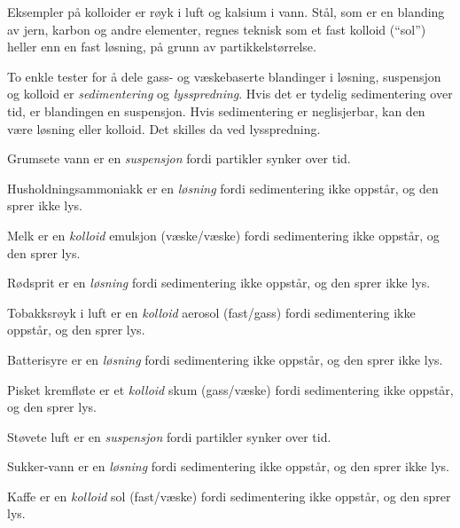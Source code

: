 \vskip 10pt

Eksempler på kolloider er røyk i luft og kalsium i vann. Stål, som er en blanding av jern, karbon og andre elementer, regnes teknisk som et fast kolloid (``sol'') heller enn en fast løsning, på grunn av partikkelstørrelse.

\vskip 10pt

To enkle tester for å dele gass- og væskebaserte blandinger i løsning, suspensjon og kolloid er {\it sedimentering} og {\it lysspredning}. Hvis det er tydelig sedimentering over tid, er blandingen en suspensjon. Hvis sedimentering er neglisjerbar, kan den være løsning eller kolloid. Det skilles da ved lysspredning.

\vskip 10pt

Grumsete vann er en {\it suspensjon} fordi partikler synker over tid.

\vskip 10pt

Husholdningsammoniakk er en {\it løsning} fordi sedimentering ikke oppstår, og den sprer ikke lys.

\vskip 10pt 

Melk er en {\it kolloid} emulsjon (væske/væske) fordi sedimentering ikke oppstår, og den sprer lys.

\vskip 10pt 

Rødsprit er en {\it løsning} fordi sedimentering ikke oppstår, og den sprer ikke lys.

\vskip 10pt 

Tobakksrøyk i luft er en {\it kolloid} aerosol (fast/gass) fordi sedimentering ikke oppstår, og den sprer lys.

\vskip 10pt 

Batterisyre er en {\it løsning} fordi sedimentering ikke oppstår, og den sprer ikke lys.

\vskip 10pt 

Pisket kremfløte er et {\it kolloid} skum (gass/væske) fordi sedimentering ikke oppstår, og den sprer lys.

\vskip 10pt 

Støvete luft er en {\it suspensjon} fordi partikler synker over tid.

\vskip 10pt 

Sukker-vann er en {\it løsning} fordi sedimentering ikke oppstår, og den sprer ikke lys.

\vskip 10pt 

Kaffe er en {\it kolloid} sol (fast/væske) fordi sedimentering ikke oppstår, og den sprer lys.










